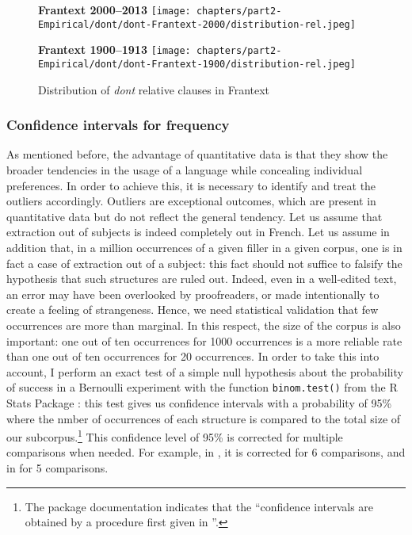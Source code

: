 \begin{figure}
    \begin{multicols}{2}
    \centering
    \textbf{Frantext 2000--2013}
    \texttt{[image: chapters/part2-Empirical/dont/dont-Frantext-2000/distribution-rel.jpeg]}
    
    \columnbreak
    
    \textbf{Frantext 1900--1913}
    \texttt{[image: chapters/part2-Empirical/dont/dont-Frantext-1900/distribution-rel.jpeg]}
    \end{multicols}
    \caption[Distribution of \emph{dont} relative clauses in Frantext 2000--2013]{Distribution of \emph{dont} relative clauses in Frantext}
    \label{fig:dont-d2000+1900}
\end{figure}

\subsubsection{Confidence intervals for frequency} \label{ch:conf-intervals-binomial}
As mentioned before, the advantage of quantitative data is that they show the broader tendencies in the usage of a language while concealing individual preferences. In order to achieve this, it is necessary to identify and treat the outliers accordingly. Outliers are exceptional outcomes, which are present in quantitative data but do not reflect the general tendency. Let us assume that extraction out of subjects is indeed completely out in French. Let us assume in addition that, in a million occurrences of a given filler in a given corpus, one is in fact a case of extraction out of a subject: this fact should not suffice to falsify the hypothesis that such structures are ruled out. Indeed, even in a well-edited text, an error may have been overlooked by proofreaders, or made intentionally to create a feeling of strangeness. Hence, we need statistical validation that few occurrences are more than marginal. In this respect, the size of the corpus is also important: one out of ten occurrences for 1000 occurrences is a more reliable rate than one out of ten occurrences for 20 occurrences. In order to take this into account, I perform an exact test of a simple null hypothesis about the probability of success in a Bernoulli experiment with the function \texttt{binom.test()} from the R Stats Package \citep{R}: this test gives us confidence intervals with a probability of 95\% where the nmber of occurrences of each structure is compared to the total size of our subcorpus.\footnote{The package documentation indicates that the ``confidence intervals are obtained by a procedure first given in \citet{Clopper.Pearson.1934.The}''.} This confidence level of 95\% is corrected for multiple comparisons when needed. For example, in  , it is corrected for 6 comparisons, and in  for 5 comparisons. 

